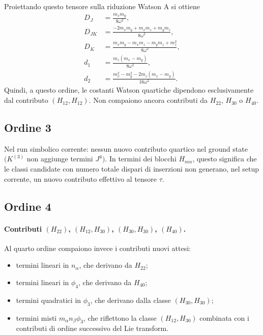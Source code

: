 \documentclass[11pt,a4paper]{article}
\begin{document}
Proiettando questo tensore sulla riduzione Watson A si ottiene
\begin{align}
D_J &= \frac{m_x m_y}{8\omega^2},\\
D_{JK} &= \frac{-2m_xm_y + m_xm_z + m_ym_z}{8\omega^2},\\
D_K &= \frac{m_xm_y - m_xm_z - m_ym_z + m_z^2}{8\omega^2},\\
d_1 &= \frac{m_z(m_x-m_y)}{8\omega^2},\\
d_2 &= \frac{m_x^2 - m_y^2 - 2m_z(m_x-m_y)}{16\omega^2}.
\end{align}
Quindi, a questo ordine, le costanti Watson quartiche dipendono esclusivamente dal contributo
\((H_{12},H_{12})\). Non compaiono ancora contributi da \(H_{22}\), \(H_{30}\) o \(H_{40}\).

\subsection{Ordine 3}
Nel run simbolico corrente: nessun nuovo contributo quartico nel ground state
\(\bigl(K^{(3)}\) non aggiunge termini \(J^4\bigr)\). In termini dei blocchi \(H_{mn}\), questo
significa che le classi candidate con numero totale dispari di inserzioni non generano,
nel setup corrente, un nuovo contributo effettivo al tensore \(\tau\).

\subsection{Ordine 4}
\paragraph{Contributi \((H_{22})\), \((H_{12},H_{30})\), \((H_{30},H_{30})\), \((H_{40})\).}
Al quarto ordine compaiono invece i contributi nuovi attesi:
\begin{itemize}
\item termini lineari in \(n_\alpha\), che derivano da \(H_{22}\);
\item termini lineari in \(\phi_4\), che derivano da \(H_{40}\);
\item termini quadratici in \(\phi_3\), che derivano dalla classe \((H_{30},H_{30})\);
\item termini misti \(m_\alpha n_\beta \phi_3\), che riflettono la classe \((H_{12},H_{30})\)
  combinata con i contributi di ordine successivo del Lie transform.
\end{itemize}
\end{document}

